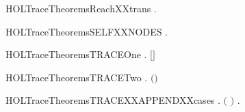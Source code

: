 \newcommand{\HOLTraceTheoremsReachXXstrongindXXright}{\UseVerbatim{HOLTraceTheoremsReachXXstrongindXXright}}
\begin{SaveVerbatim}{HOLTraceTheoremsReachXXtrans}
\HOLTokenTurnstile{} \HOLSymConst{\HOLTokenForall{}}  .    \HOLSymConst{\HOLTokenConj{}}    \HOLSymConst{\HOLTokenImp{}}   
\end{SaveVerbatim}
\newcommand{\HOLTraceTheoremsReachXXtrans}{\UseVerbatim{HOLTraceTheoremsReachXXtrans}}
\begin{SaveVerbatim}{HOLTraceTheoremsSELFXXNODES}
\HOLTokenTurnstile{} \HOLSymConst{\HOLTokenForall{}}.  \HOLConst{\HOLTokenIn{}}  
\end{SaveVerbatim}
\newcommand{\HOLTraceTheoremsSELFXXNODES}{\UseVerbatim{HOLTraceTheoremsSELFXXNODES}}
\begin{SaveVerbatim}{HOLTraceTheoremsTRACEOne}
\HOLTokenTurnstile{} \HOLSymConst{\HOLTokenForall{}}  .  \HOLTokenTransBegin{}\HOLTokenTransEnd {} \HOLSymConst{\HOLTokenImp{}}   \ensuremath{[}\ensuremath{]} 
\end{SaveVerbatim}
\newcommand{\HOLTraceTheoremsTRACEOne}{\UseVerbatim{HOLTraceTheoremsTRACEOne}}
\begin{SaveVerbatim}{HOLTraceTheoremsTRACETwo}
\HOLTokenTurnstile{} \HOLSymConst{\HOLTokenForall{}}    .  \HOLTokenTransBegin{}\HOLTokenTransEnd {} \HOLSymConst{\HOLTokenConj{}}     \HOLSymConst{\HOLTokenImp{}}   \ensuremath{(}\HOLSymConst{::}\ensuremath{)} 
\end{SaveVerbatim}
\newcommand{\HOLTraceTheoremsTRACETwo}{\UseVerbatim{HOLTraceTheoremsTRACETwo}}
\begin{SaveVerbatim}{HOLTraceTheoremsTRACEXXAPPENDXXcases}
\HOLTokenTurnstile{} \HOLSymConst{\HOLTokenForall{}}   .
         \ensuremath{(} \HOLSymConst{++} \ensuremath{)}  \HOLSymConst{\HOLTokenEquiv{}} \HOLSymConst{\HOLTokenExists{}}.     \HOLSymConst{\HOLTokenConj{}}    
\end{SaveVerbatim}
